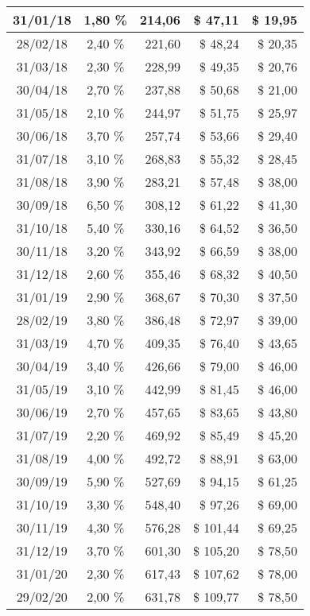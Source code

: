 \begin{longtable}{|c|c|r|r|r|}
31/01/18 & 1,80 \% & 214,06 & \$ 47,11 & \$ 19,95 \\ \hline
28/02/18 & 2,40 \% & 221,60 & \$ 48,24 & \$ 20,35 \\ \hline
31/03/18 & 2,30 \% & 228,99 & \$ 49,35 & \$ 20,76 \\ \hline
30/04/18 & 2,70 \% & 237,88 & \$ 50,68 & \$ 21,00 \\ \hline
31/05/18 & 2,10 \% & 244,97 & \$ 51,75 & \$ 25,97 \\ \hline
30/06/18 & 3,70 \% & 257,74 & \$ 53,66 & \$ 29,40 \\ \hline
31/07/18 & 3,10 \% & 268,83 & \$ 55,32 & \$ 28,45 \\ \hline
31/08/18 & 3,90 \% & 283,21 & \$ 57,48 & \$ 38,00 \\ \hline
30/09/18 & 6,50 \% & 308,12 & \$ 61,22 & \$ 41,30 \\ \hline
31/10/18 & 5,40 \% & 330,16 & \$ 64,52 & \$ 36,50 \\ \hline
30/11/18 & 3,20 \% & 343,92 & \$ 66,59 & \$ 38,00 \\ \hline
31/12/18 & 2,60 \% & 355,46 & \$ 68,32 & \$ 40,50 \\ \hline
31/01/19 & 2,90 \% & 368,67 & \$ 70,30 & \$ 37,50 \\ \hline
28/02/19 & 3,80 \% & 386,48 & \$ 72,97 & \$ 39,00 \\ \hline
31/03/19 & 4,70 \% & 409,35 & \$ 76,40 & \$ 43,65 \\ \hline
30/04/19 & 3,40 \% & 426,66 & \$ 79,00 & \$ 46,00 \\ \hline
31/05/19 & 3,10 \% & 442,99 & \$ 81,45 & \$ 46,00 \\ \hline
30/06/19 & 2,70 \% & 457,65 & \$ 83,65 & \$ 43,80 \\ \hline
31/07/19 & 2,20 \% & 469,92 & \$ 85,49 & \$ 45,20 \\ \hline
31/08/19 & 4,00 \% & 492,72 & \$ 88,91 & \$ 63,00 \\ \hline
30/09/19 & 5,90 \% & 527,69 & \$ 94,15 & \$ 61,25 \\ \hline
31/10/19 & 3,30 \% & 548,40 & \$ 97,26 & \$ 69,00 \\ \hline
30/11/19 & 4,30 \% & 576,28 & \$ 101,44 & \$ 69,25 \\ \hline
31/12/19 & 3,70 \% & 601,30 & \$ 105,20 & \$ 78,50 \\ \hline
31/01/20 & 2,30 \% & 617,43 & \$ 107,62 & \$ 78,00 \\ \hline
29/02/20 & 2,00 \% & 631,78 & \$ 109,77 & \$ 78,50 \\ \hline

\end{longtable}
